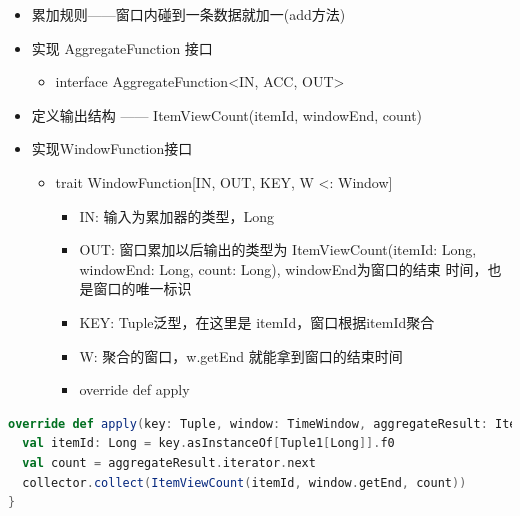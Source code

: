 \documentclass[oneside]{ctexbook}
\begin{document}
\begin{itemize}
\item 累加规则——窗口内碰到一条数据就加一(add方法)
\item 实现 AggregateFunction 接口
\begin{itemize}
\item interface AggregateFunction<IN, ACC, OUT>
\end{itemize}
\item 定义输出结构 —— ItemViewCount(itemId, windowEnd, count)
\item 实现WindowFunction接口
\begin{itemize}
\item trait WindowFunction[IN, OUT, KEY, W <: Window]
\begin{itemize}
\item IN: 输入为累加器的类型，Long
\item OUT: 窗口累加以后输出的类型为 ItemViewCount(itemId: Long, windowEnd: Long, count: Long), windowEnd为窗口的结束 时间，也是窗口的唯一标识
\item KEY: Tuple泛型，在这里是 itemId，窗口根据itemId聚合
\item W: 聚合的窗口，w.getEnd 就能拿到窗口的结束时间
\item override def apply
\end{itemize}
\end{itemize}
\end{itemize}

\begin{lstlisting}[language=scala]
override def apply(key: Tuple, window: TimeWindow, aggregateResult: Iterable[Long], collector: Collector[ItemViewCount]) : Unit = {
  val itemId: Long = key.asInstanceOf[Tuple1[Long]].f0
  val count = aggregateResult.iterator.next
  collector.collect(ItemViewCount(itemId, window.getEnd, count))
}
\end{lstlisting}
\end{document}
